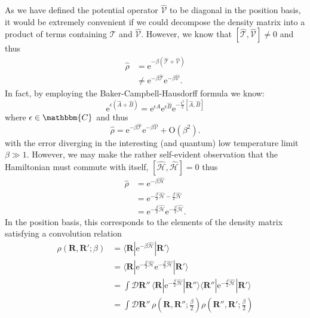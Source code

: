 \documentclass[prb,aps,amssym,nofootinbib,floatfix,notitlepage]{revtex4-1}
\renewcommand{\vec}[1]{\boldsymbol{#1}}
\newcommand{\e}[1]{\mathrm{e}^{#1}}
\newcommand{\R}{\vec{R}}
\begin{document}
As we have defined the potential operator $\hat{\mathcal{V}}$ to be diagonal in
the position basis, it would be extremely convenient if we could decompose the
density matrix into a product of terms containing $\hat{\mathcal{T}}$ and
$\hat{\mathcal{V}}$.  However, we know that
$[\hat{\mathcal{T}},\hat{\mathcal{V}}] \ne 0$ and thus
%
\begin{align}
    \hat{\rho} &= \e{-\beta(\hat{\mathcal{T}} + \hat{\mathcal{V}})} \nonumber
    \\
&\ne \e{-\beta\hat{\mathcal{T}}}\e{-\beta\hat{\mathcal{V}}}.
\end{align}
%
In fact, by employing the Baker-Campbell-Hausdorff formula we know:
%
\begin{equation}
    \e{\epsilon(\hat{A}+\hat{B})} = \e{\epsilon\hat{A}}\e{\epsilon\hat{B}}
    \e{-\frac{\epsilon^2}{2}[\hat{A},\hat{B}]}
    \label{eq:BCH}
\end{equation}
%
where $\epsilon \in \mathbbm{C}$ and thus 
%
\begin{equation}
    \hat{\rho} = \e{-\beta\hat{\mathcal{T}}}\e{-\beta\hat{\mathcal{V}}} +
    \mathrm{O}\left(\beta^2\right).
\end{equation}
%
with the error diverging in the interesting (and quantum) low temperature limit
$\beta \gg 1$.  However, we may make the rather self-evident observation that
the Hamiltonian must commute with itself,
$[\hat{\mathcal{H}},\hat{\mathcal{H}}] = 0$ thus
%
\begin{align}
    \hat{\rho} &= \e{-\beta \hat{\mathcal{H}}} \nonumber \\
               &= \e{-\frac{\beta}{2}\hat{\mathcal{H}}
-\frac{\beta}{2}\hat{\mathcal{H}}} \nonumber \\
&= \e{-\frac{\beta}{2}\hat{\mathcal{H}}}\e{-\frac{\beta}{2}\hat{\mathcal{H}}}.
\label{eq:HamCommute}
\end{align}
%
In the position basis, this corresponds to the elements of the density matrix
satisfying a convolution relation
%
\begin{align}
    \rho(\R,\R';\beta) &=  \langle \R | \e{-\beta \hat{\mathcal{H}}} | \R'\rangle \nonumber \\
    &=  \langle \R | \e{-\frac{\beta}{2} \hat{\mathcal{H}}} 
    \e{-\frac{\beta}{2} \hat{\mathcal{H}}}| \R'\rangle \nonumber \\
    &= \int \mathcal{D}\R''\,
    \langle \R | \e{-\frac{\beta}{2} \hat{\mathcal{H}}} | \R''\rangle 
    \langle \R'' | \e{-\frac{\beta}{2} \hat{\mathcal{H}}} | \R'\rangle \nonumber \\
    &= \int \mathcal{D}\R''\,
    \rho\left(\R,\R'';\frac{\beta}{2}\right)
    \rho\left(\R'',\R';\frac{\beta}{2}\right)
\label{eq:rhoConvolution}
\end{align}
\end{document}
